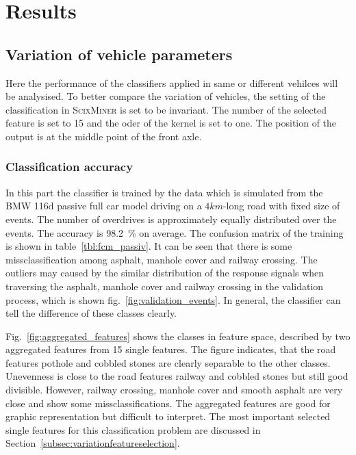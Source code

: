 \chapter{Results}


\section{Variation of vehicle parameters}
\label{sec:var_vehicle}

Here the performance of the classifiers applied in same or different vehilces will be analysised.
%
To better compare the variation of vehicles, the setting of the classification in \textsc{ScixMiner} is set to be invariant.
%
The number of the selected feature is set to 15 and the oder of the kernel is set to one.
%
The position of the output is at the middle point of the front axle.

\subsection{Classification accuracy}
\label{subsec:accuracy}

In this part the classifier is trained by the data which is simulated from the BMW 116d passive full car model driving on a $4km$-long road with fixed size of events.
%
The number of overdrives is approximately equally distributed over the events.
%
The accuracy is 98.2~\% on average.
%
The confusion matrix of the training is shown in table~\ref{tbl:fcm_passiv}.
%
It can be seen that there is some missclassification among asphalt, manhole cover and railway crossing.
%
The outliers may caused by the similar distribution of the response signals when traversing the asphalt, manhole cover and railway crossing in the validation process, which is shown fig.~\ref{fig:validation_events}.
%
In general, the classifier can tell the difference of these classes clearly.

Fig.~\ref{fig:aggregated_features} shows the classes in feature space, described by two aggregated features from 15 single features.
%
The figure indicates, that the road features pothole and cobbled stones are clearly separable to the other classes.
%
Unevenness is close to the road features railway and cobbled stones but still good divisible. 
%
However, railway crossing, manhole cover and smooth asphalt are very close and show some missclassifications.
%
The aggregated features are good for graphic representation but difficult to interpret.
%
The most important selected single features for this classification problem are discussed in Section~\ref{subsec:variationfeatureselection}.



